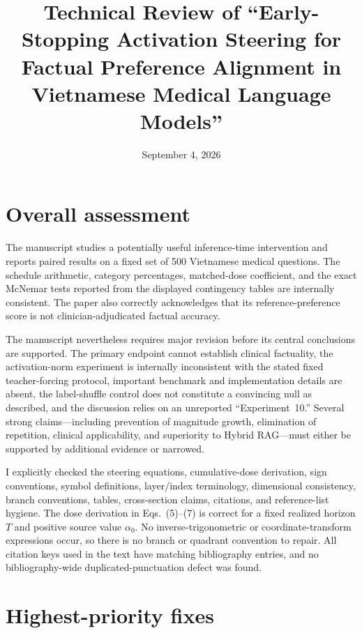 \documentclass[11pt]{article}
\title{Technical Review of ``Early-Stopping Activation Steering for Factual Preference Alignment in Vietnamese Medical Language Models''}
\author{}
\date{September 4, 2026}
\begin{document}
\maketitle

\section*{Overall assessment}

The manuscript studies a potentially useful inference-time intervention and reports paired results on a fixed set of 500 Vietnamese medical questions.  The schedule arithmetic, category percentages, matched-dose coefficient, and the exact McNemar tests reported from the displayed contingency tables are internally consistent.  The paper also correctly acknowledges that its reference-preference score is not clinician-adjudicated factual accuracy.

The manuscript nevertheless requires major revision before its central conclusions are supported.  The primary endpoint cannot establish clinical factuality, the activation-norm experiment is internally inconsistent with the stated fixed teacher-forcing protocol, important benchmark and implementation details are absent, the label-shuffle control does not constitute a convincing null as described, and the discussion relies on an unreported ``Experiment~10.''  Several strong claims---including prevention of magnitude growth, elimination of repetition, clinical applicability, and superiority to Hybrid RAG---must either be supported by additional evidence or narrowed.

I explicitly checked the steering equations, cumulative-dose derivation, sign conventions, symbol definitions, layer/index terminology, dimensional consistency, branch conventions, tables, cross-section claims, citations, and reference-list hygiene.  The dose derivation in Eqs.~(5)--(7) is correct for a fixed realized horizon $T$ and positive source value $\alpha_0$.  No inverse-trigonometric or coordinate-transform expressions occur, so there is no branch or quadrant convention to repair.  All citation keys used in the text have matching bibliography entries, and no bibliography-wide duplicated-punctuation defect was found.

\section*{Highest-priority fixes}
\end{document}
